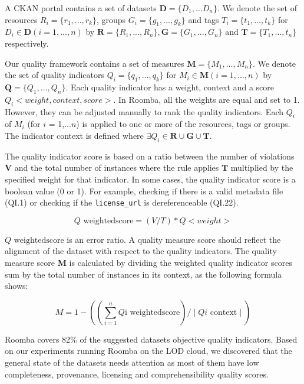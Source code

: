 \documentclass[a4paper,11pt,twoside]{ThesisStyle}
\begin{document}
A CKAN portal contains a set of datasets $\textbf{D} = \{D_1,...D_n\}$. We denote the set of resources $R_i = \{r_1,...,r_k\}$, groups $G_i = \{g_1,...,g_k\}$ and tags $T_i = \{t_1,...,t_k\}$ for $D_i \in \textbf{D} (i=1,...,n)$ by $  \textbf{R}=\{R_1,...,R_n\}, \textbf{G}=\{G_1,...,G_n\}$ and $\textbf{T}=\{T_1,...,t_n\}$ respectively.

Our quality framework contains a set of measures $\textbf{M} = \{M_1,...,M_n\}$. We denote the set of quality indicators $Q_i = \{q_1,...,q_k\}$ for $M_i \in \textbf{M} (i=1,...,n)$ by $\textbf{Q} = \{Q_1,...,Q_n\}$. Each quality indicator has a weight, context and a score $Q_i<weight, context, score>$. In Roomba, all the weights are equal and set to 1. However, they can be adjusted manually to rank the quality indicators. Each $Q_i$ of $M_i$ (for $i$ = 1,...$n$) is applied to one or more of the resources, tags or groups. The indicator context is defined where $\exists Q_i \in \textbf{R} \cup \textbf{G} \cup \textbf{T}$.

The quality indicator score is based on a ratio between the number of violations $\textbf{V}$ and the total number of instances where the rule applies $\textbf{T}$ multiplied by the specified weight for that indicator. In some cases, the quality indicator score is a boolean value (0 or 1). For example, checking if there is a valid metadata file (QI.1) or checking if the \texttt{license\_url} is dereferenceable (QI.22).


\begin{equation}
 Q\textrm{ weightedscore} = (V/T) * Q<weight>
\end{equation}

$Q\textrm{ weightedscore}$ is an error ratio. A quality measure score should reflect the alignment of the dataset with respect to the quality indicators. The quality measure score \textbf{M} is calculated by dividing the weighted quality indicator scores sum by the total number of instances in its context, as the following formula shows:

\begin{equation}
M =  1 - ((\sum_{i=1}^{n} Q\textrm{i weightedscore}) / \mid Qi\textrm{ context} \mid )
\end{equation}

Roomba covers 82\% of the suggested datasets objective quality indicators. Based on our experiments running Roomba on the LOD cloud, we discovered that the general state of the datasets needs attention as most of them have low completeness, provenance, licensing and comprehensibility quality scores.
\end{document}
